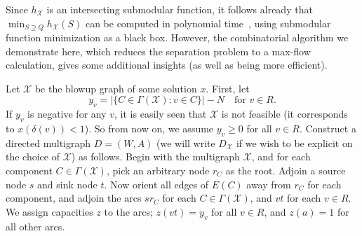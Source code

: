\documentclass[11pt, letterpaper]{article}
\theoremstyle{definition}
\newcommand{\grphx}{\mathcal{X}}
\newcommand{\compof}[1]{\Gamma(#1)}
\newcommand{\compx}{\compof{\grphx}}
\newcommand{\slkx}{h_{\grphx}}
\begin{document}
Since $\slkx$ is an intersecting submodular function, it follows already that $\min_{S \supseteq Q} \slkx(S)$ can be computed in polynomial time~\cite{schrijver_2003_combinatorial}, using submodular function minimization as a black box. 
However, the combinatorial algorithm we demonstrate here, which reduces the separation problem to a max-flow calculation, gives some additional insights (as well as being more efficient).

Let $\grphx$ be the blowup graph of some solution $x$.
First, let 
\[ y_v = |\{C \in \compx: v \in C\}| - N \quad \text{for } v \in R. \]
If $y_v$ is negative for any $v$, it is easily seen that $\grphx$ is not feasible (it corresponds to $x(\delta(v)) < 1$). 
So from now on, we assume $y_v \geq 0$ for all $v \in R$.
Construct a directed multigraph $D=(W,A)$ (we will write $D_\grphx$ if we wish to be explicit on the choice of $\grphx$) as follows. 
Begin with the multigraph $\grphx$, and for each component $C \in \compx$, pick an arbitrary node $r_C$ as the root.
Adjoin a source node $s$ and sink node $t$.
Now orient all edges of $E(C)$ away from $r_C$ for each component, and adjoin the arcs $sr_C$ for each $C \in \compx$, and $vt$ for each $v \in R$.
We assign capacities $z$ to the arcs; $z(vt) = y_v$ for all $v \in R$, and $z(a) = 1$ for all other arcs.
\end{document}
